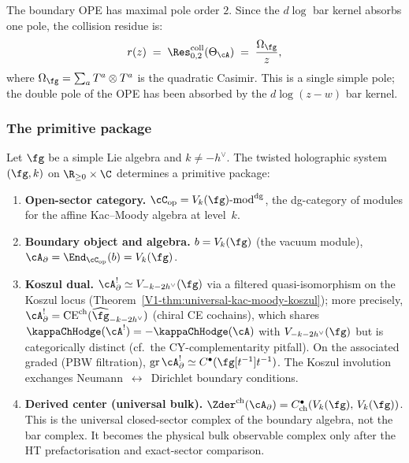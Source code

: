 The boundary OPE has maximal pole order $2$. Since the
$d\log$ bar kernel absorbs one pole, the collision residue is:
\begin{equation}\label{eq:tw-hol-r-matrix}
r(z)
\;=\;
\Res^{\mathrm{coll}}_{0,2}(\Theta_\cA)
\;=\;
\frac{\Omega_\fg}{z},
\end{equation}
where $\Omega_\fg = \sum_a T^a \otimes T^a$ is the
quadratic Casimir. This is a single simple pole; the double pole
of the OPE has been absorbed by the $d\log(z-w)$ bar kernel.

\subsubsection{The primitive package}

\begin{theorem}
\label{thm:tw-hol-primitive-package}
Let $\fg$ be a simple Lie algebra and $k \ne -h^\vee$. The
twisted holographic system $(\fg, k)$ on $\R_{\ge 0} \times \C$
determines a primitive package:
\begin{enumerate}[label=\textup{(\roman*)},nosep]
\item \textbf{Open-sector category.}
 $\cC_{\mathrm{op}} = V_k(\fg)\text{-}\mathrm{mod}^{\mathrm{dg}}$,
 the dg-category of modules for the affine Kac--Moody algebra at
 level~$k$.

\item \textbf{Boundary object and algebra.}
 $b = V_k(\fg)$ \textup{(}the vacuum module\textup{)},
 $\cA_\partial = \End_{\cC_{\mathrm{op}}}(b) = V_k(\fg)$.

\item \textbf{Koszul dual.}
 $\cA_\partial^! \simeq V_{-k-2h^\vee}(\fg)$ via a filtered
 quasi-isomorphism on the Koszul locus
 \textup{(}Theorem~\ref*{V1-thm:universal-kac-moody-koszul}\textup{)};
 more precisely, $\cA_\partial^! = \mathrm{CE}^{\mathrm{ch}}(\widehat\fg_{-k-2h^\vee})$
 \textup{(}chiral CE cochains\textup{)}, which shares
 $\kappaChHodge(\cA^!) = -\kappaChHodge(\cA)$ with $V_{-k-2h^\vee}(\fg)$
 but is categorically distinct (cf.\ the CY-complementarity pitfall).
 On the associated graded \textup{(}PBW filtration\textup{)},
 $\operatorname{gr}\cA_\partial^! \simeq C^\bullet(\fg[t^{-1}]t^{-1})$.
 The Koszul involution exchanges Neumann~$\leftrightarrow$~Dirichlet
 boundary conditions.

\item \textbf{Derived center \textup{(}universal bulk\textup{)}.}
 $\Zder^{\mathrm{ch}}(\cA_\partial)
 = C^\bullet_{\mathrm{ch}}(V_k(\fg),\, V_k(\fg))$.
 This is the universal closed-sector complex of the boundary algebra,
 not the bar complex. It becomes the physical bulk observable complex
 only after the HT prefactorisation and exact-sector comparison.


\end{enumerate}
\end{theorem}
